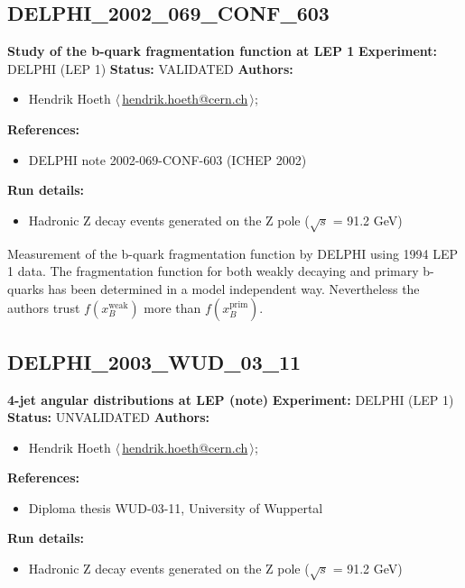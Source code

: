 \subsection{DELPHI\_2002\_069\_CONF\_603}
\textbf{Study of the b-quark fragmentation function at LEP 1}\newline
\textbf{Experiment:} DELPHI (LEP 1) \newline
\textbf{Status:} VALIDATED\newline
\textbf{Authors:}
\begin{itemize}
  \item Hendrik Hoeth $\langle\,$\href{mailto:hendrik.hoeth@cern.ch}{hendrik.hoeth@cern.ch}$\,\rangle$;
\end{itemize}
\textbf{References:}
\begin{itemize}
  \item DELPHI note 2002-069-CONF-603 (ICHEP 2002)
\end{itemize}
\textbf{Run details:}
\begin{itemize}

  \item Hadronic Z decay events generated on the Z pole (\ensuremath{\sqrt{s}} = 91.2 GeV)\end{itemize}

\noindent Measurement of the b-quark fragmentation function by DELPHI using 1994 LEP 1 data. The fragmentation function for both weakly decaying and primary b-quarks has been determined in a model independent way. Nevertheless the authors trust $f(x_B^\text{weak})$ more than $f(x_B^\text{prim})$.

\clearpage


\clearpage

\subsection{DELPHI\_2003\_WUD\_03\_11}
\textbf{4-jet angular distributions at LEP (note)}\newline
\textbf{Experiment:} DELPHI (LEP 1) \newline
\textbf{Status:} UNVALIDATED\newline
\textbf{Authors:}
\begin{itemize}
  \item Hendrik Hoeth $\langle\,$\href{mailto:hendrik.hoeth@cern.ch}{hendrik.hoeth@cern.ch}$\,\rangle$;
\end{itemize}
\textbf{References:}
\begin{itemize}
  \item Diploma thesis WUD-03-11, University of Wuppertal
\end{itemize}
\textbf{Run details:}
\begin{itemize}

  \item Hadronic Z decay events generated on the Z pole (\ensuremath{\sqrt{s}} = 91.2 GeV)\end{itemize}

